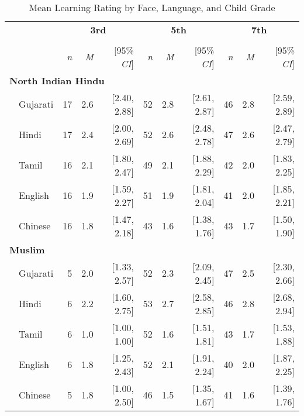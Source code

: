 \begin{table}[t]
\centering
\caption{Mean Learning Rating by Face, Language, and Child Grade}\\
\begin{footnotesize}
\label{tab:face-learning-means}
\begin{tabular}{p{.1in}lrrrrrrrrr}
\toprule
 &  & \multicolumn{3}{c}{\textbf{3rd}} & \multicolumn{3}{c}{\textbf{5th}} & \multicolumn{3}{c}{\textbf{7th}} \\
\cline{3-5} \cline{6-8} \cline{9-11}\\[-.75em]
&  & \textit{n} & \textit{M} & [95\% \textit{CI}] &  \textit{n} & \textit{M} & [95\% \textit{CI}] &  \textit{n}  & \textit{M} & [95\% \textit{CI}]\\
\midrule
\multicolumn{11}{l}{\textbf{North Indian Hindu}}\\
 & Gujarati & 17 & 2.6 & [2.40, 2.88] & 52 & 2.8 & [2.61, 2.87] & 46 & 2.8 & [2.59, 2.89]\\

 & Hindi & 17 & 2.4 & [2.00, 2.69] & 52 & 2.6 & [2.48, 2.78] & 47 & 2.6 & [2.47, 2.79]\\

& Tamil & 16 & 2.1 & [1.80, 2.47] & 49 & 2.1 & [1.88, 2.29] & 42 & 2.0 & [1.83, 2.25]\\

 & English & 16 & 1.9 & [1.59, 2.27] & 51 & 1.9 & [1.81, 2.04] & 41 & 2.0 & [1.85, 2.21]\\

& Chinese & 16 & 1.8 & [1.47, 2.18] & 43 & 1.6 & [1.38, 1.76] & 43 & 1.7 & [1.50, 1.90]\\

\midrule
\multicolumn{11}{l}{\textbf{Muslim}}\\
& Gujarati & 5 & 2.0 & [1.33, 2.57] & 52 & 2.3 & [2.09, 2.45] & 47 & 2.5 & [2.30, 2.66]\\

 & Hindi & 6 & 2.2 & [1.60, 2.75] & 53 & 2.7 & [2.58, 2.85] & 46 & 2.8 & [2.68, 2.94]\\

& Tamil & 6 & 1.0 & [1.00, 1.00] & 52 & 1.6 & [1.51, 1.81] & 43 & 1.7 & [1.53, 1.88]\\

 & English & 6 & 1.8 & [1.25, 2.43] & 52 & 2.1 & [1.91, 2.24] & 40 & 2.0 & [1.87, 2.25]\\
 & Chinese & 5 & 1.8 & [1.00, 2.50] & 46 & 1.5 & [1.35, 1.67] & 41 & 1.6 & [1.39, 1.76]\\


\end{tabular}
\end{footnotesize}
\end{table}

